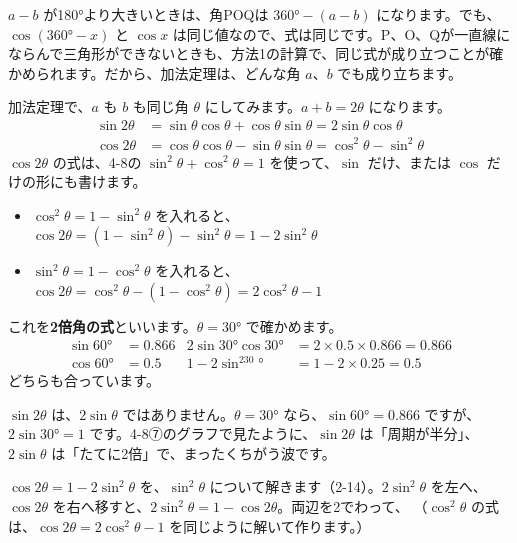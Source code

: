 \begin{seikaku}
$a-b$ が180°より大きいときは、角POQは $360°-(a-b)$ になります。でも、$\cos(360°-x)$ と $\cos x$ は同じ値なので、式は同じです。P、O、Qが一直線にならんで三角形ができないときも、方法1の計算で、同じ式が成り立つことが確かめられます。だから、加法定理は、どんな角 $a$、$b$ でも成り立ちます。
\end{seikaku}


\leavevmode\label{bk:4-9:nibai}加法定理で、$a$ も $b$ も同じ角 $\theta$ にしてみます。$a+b=2\theta$ になります。
\begin{align*}
\sin2\theta&=\sin\theta\cos\theta+\cos\theta\sin\theta=2\sin\theta\cos\theta\\
\cos2\theta&=\cos\theta\cos\theta-\sin\theta\sin\theta=\cos^2\theta-\sin^2\theta
\end{align*}
$\cos2\theta$ の式は、4-8の $\sin^2\theta+\cos^2\theta=1$ を使って、$\sin$ だけ、または $\cos$ だけの形にも書けます。
\begin{itemize}[leftmargin=1.2\zw, itemsep=2pt, topsep=2pt, label={\color{\bkTT}●}]
\item $\cos^2\theta=1-\sin^2\theta$ を入れると、$\cos2\theta=(1-\sin^2\theta)-\sin^2\theta=1-2\sin^2\theta$
\item $\sin^2\theta=1-\cos^2\theta$ を入れると、$\cos2\theta=\cos^2\theta-(1-\cos^2\theta)=2\cos^2\theta-1$
\end{itemize}
これを\textbf{2倍角の式}といいます。$\theta=30°$ で確かめます。
\begin{align*}
\sin60°&=0.866 & 2\sin30°\cos30°&=2\times0.5\times0.866=0.866\\
\cos60°&=0.5 & 1-2\sin^230°&=1-2\times0.25=0.5
\end{align*}
どちらも合っています。

$\sin2\theta$ は、$2\sin\theta$ ではありません。$\theta=30°$ なら、$\sin60°=0.866$ ですが、$2\sin30°=1$ です。4-8⑦のグラフで見たように、$\sin2\theta$ は「周期が半分」、$2\sin\theta$ は「たてに2倍」で、まったくちがう波です。

$\cos2\theta=1-2\sin^2\theta$ を、$\sin^2\theta$ について解きます（2-14）。$2\sin^2\theta$ を左へ、$\cos2\theta$ を右へ移すと、$2\sin^2\theta=1-\cos2\theta$。両辺を2でわって、
（$\cos^2\theta$ の式は、$\cos2\theta=2\cos^2\theta-1$ を同じように解いて作ります。）

